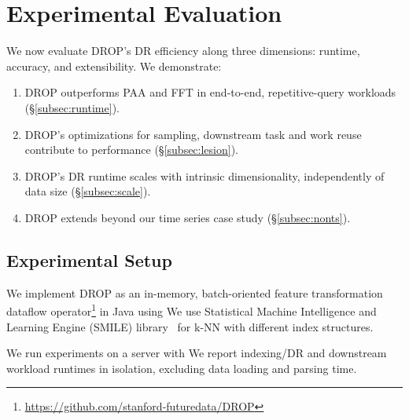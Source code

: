 
\section{Experimental Evaluation}
\label{sec:experiments}

We now evaluate DROP's DR efficiency along three dimensions: runtime, accuracy, and extensibility. We demonstrate: 

\begin{enumerate}[itemsep=0.5em]
\item{DROP outperforms PAA and FFT in end-to-end, repetitive-query workloads (\S\ref{subsec:runtime}).}	
\item{DROP's optimizations for sampling, downstream task and work reuse contribute to performance (\S\ref{subsec:lesion}).}
\item{DROP's DR runtime scales with intrinsic dimensionality, independently of data size (\S\ref{subsec:scale}).}
\item{DROP extends beyond our time series case study (\S\ref{subsec:nonts}).}	
\end{enumerate}

\subsection{Experimental Setup}
\label{subsec:setup}
 We implement DROP as an in-memory, batch-oriented feature transformation dataflow operator\footnote{\href{https://github.com/stanford-futuredata/DROP}{https://github.com/stanford-futuredata/DROP}}
in Java using 
We use  Statistical Machine Intelligence and Learning Engine (SMILE) library~\cite{smile} for k-NN with different index structures. 

 We run experiments on a server with 
We report indexing/DR and downstream workload runtimes in isolation, excluding data loading and parsing time.

